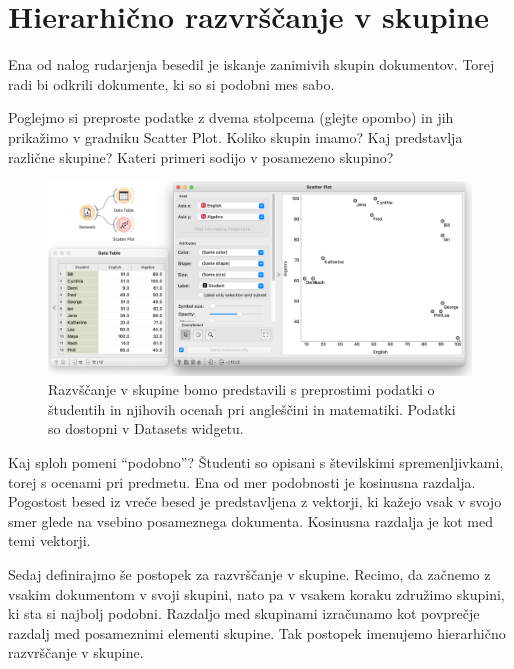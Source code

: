 \chapter{Hierarhično razvrščanje v skupine}
\label{ch:hierarhicno-razvrscanje}

Ena od nalog rudarjenja besedil je iskanje zanimivih skupin dokumentov. Torej radi bi odkrili dokumente, ki so si podobni mes sabo. 

Poglejmo si preproste podatke z dvema stolpcema (glejte opombo) in jih prikažimo v gradniku Scatter Plot. Koliko skupin imamo? Kaj predstavlja različne skupine? Kateri primeri sodijo v posamezeno skupino?

\begin{figure}[h]
    \includegraphics[width=\linewidth]{grades.png}%
    \caption{Razvščanje v skupine bomo predstavili s preprostimi podatki o študentih in njihovih ocenah pri angleščini in matematiki. Podatki so dostopni v Datasets widgetu.}
    \label{fig:010-grades-example}
\end{figure}
  
Kaj sploh pomeni “podobno”? Študenti so opisani s številskimi spremenljivkami, torej s ocenami pri predmetu. Ena od mer podobnosti je kosinusna razdalja. Pogostost besed iz vreče besed je predstavljena z vektorji, ki kažejo vsak v svojo smer glede na vsebino posameznega dokumenta. Kosinusna razdalja je kot med temi vektorji.

Sedaj definirajmo še postopek za razvrščanje v skupine. Recimo, da začnemo z vsakim dokumentom v svoji skupini, nato pa v vsakem koraku združimo skupini, ki sta si najbolj podobni. Razdaljo med skupinami izračunamo kot povprečje razdalj med posameznimi elementi skupine. Tak postopek imenujemo hierarhično razvrščanje v skupine.

